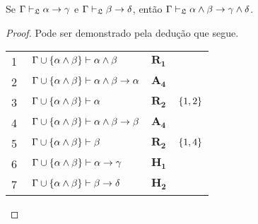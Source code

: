 \vspace{.5\baselineskip}
\begin{tcolorbox}[enhanced jigsaw, breakable, sharp corners, colframe=black, colback=white, boxrule=0.5pt, left=1.5mm, right=1.5mm, top=1.5mm, bottom=1.5mm]
    \begin{lemma}\label{conjunction.exchange}
        Se $\Gamma\mathrel{\vdash}_\mathfrak{L}\alpha\to\gamma$ e $\Gamma\mathrel{\vdash}_\mathfrak{L}\beta\to\delta$, então $\Gamma\mathrel{\vdash}_\mathfrak{L}\alpha\wedge\beta\to\gamma\wedge\delta$.
        \begin{proof}
        Pode ser demonstrado pela dedução que segue.

        \vspace{0.5\baselineskip}
        \footnotesize
        \setlength{\rowskip}{0.5\baselineskip}
        \begin{xltabular}{\textwidth}{r | X l l}
            \scriptsize{\phantom{0}1}\phantom{ } & $\ \Gamma\cup\set{\alpha\wedge\beta}\vdash\alpha\wedge\beta$                     & $\hyperref[modal.rule.1]{\mathbf{R_1}}$\phantom{1} & \\[\rowskip]
            \scriptsize{\phantom{0}2}\phantom{ } & $\ \Gamma\cup\set{\alpha\wedge\beta}\vdash\alpha\wedge\beta\to\alpha$            & $\hyperref[modal.axiom.4]{\mathbf{A_4}}$           & \\[\rowskip]
            \scriptsize{\phantom{0}3}\phantom{ } & $\ \Gamma\cup\set{\alpha\wedge\beta}\vdash\alpha$                                & $\hyperref[modal.rule.2]{\mathbf{R_2}}$            & $\left\{1,2\right\}$\\[\rowskip]
            \scriptsize{\phantom{0}4}\phantom{ } & $\ \Gamma\cup\set{\alpha\wedge\beta}\vdash\alpha\wedge\beta\to\beta$             & $\hyperref[modal.axiom.4]{\mathbf{A_4}}$           & \\[\rowskip]
            \scriptsize{\phantom{0}5}\phantom{ } & $\ \Gamma\cup\set{\alpha\wedge\beta}\vdash\beta$                                 & $\hyperref[modal.rule.2]{\mathbf{R_2}}$            & $\left\{1,4\right\}$\\[\rowskip]
            \scriptsize{\phantom{0}6}\phantom{ } & $\ \Gamma\cup\set{\alpha\wedge\beta}\vdash\alpha\to\gamma$                       & $\mathbf{H_1}$                                     & \\[\rowskip]
            \scriptsize{\phantom{0}7}\phantom{ } & $\ \Gamma\cup\set{\alpha\wedge\beta}\vdash\beta\to\delta$                        & $\mathbf{H_2}$                                     & \\[\rowskip]

\end{xltabular}
\end{proof}
\end{lemma}
\end{tcolorbox}
